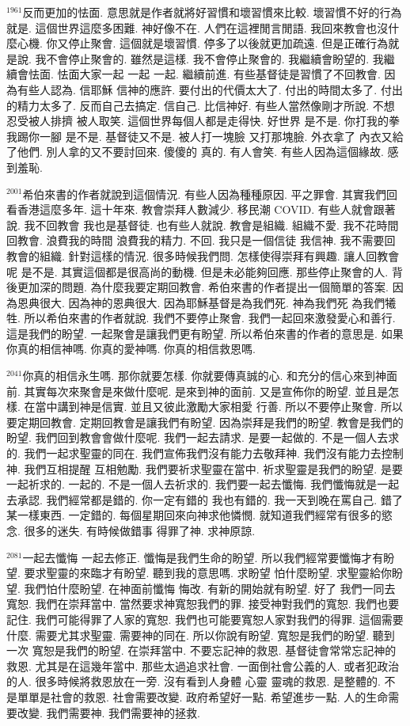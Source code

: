 \documentclass{book}
\begin{document}
$^{1961}$反而更加的怯面.
意思就是作者就將好習慣和壞習慣來比較.
壞習慣不好的行為就是.
這個世界這麼多困難.
神好像不在.
人們在這裡閒言閒語.
我回來教會也沒什麼心機.
你又停止聚會.
這個就是壞習慣.
停多了以後就更加疏遠.
但是正確行為就是說.
我不會停止聚會的.
雖然是這樣.
我不會停止聚會的.
我繼續會盼望的.
我繼續會怯面.
怯面大家一起 一起 一起.
繼續前進.
有些基督徒是習慣了不回教會.
因為有些人認為.
信耶穌 信神的應許.
要付出的代價太大了.
付出的時間太多了.
付出的精力太多了.
反而自己去搞定.
信自己.
比信神好.
有些人當然像剛才所說.
不想忍受被人排擠 被人取笑.
這個世界每個人都是走得快.
好世界 是不是.
你打我的拳 我踢你一腳 是不是.
基督徒又不是.
被人打一塊臉 又打那塊臉.
外衣拿了 內衣又給了他們.
別人拿的又不要討回來.
傻傻的 真的.
有人會笑.
有些人因為這個緣故.
感到羞恥.

$^{2001}$希伯來書的作者就說到這個情況.
有些人因為種種原因.
平之罪會.
其實我們回看香港這麼多年.
這十年來.
教會崇拜人數減少.
移民潮 COVID.
有些人就會跟著說.
我不回教會 我也是基督徒.
也有些人就說.
教會是組織.
組織不愛.
我不花時間回教會.
浪費我的時間 浪費我的精力.
不回.
我只是一個信徒 我信神.
我不需要回教會的組織.
針對這樣的情況.
很多時候我們問.
怎樣使得崇拜有興趣.
讓人回教會呢 是不是.
其實這個都是很高尚的動機.
但是未必能夠回應.
那些停止聚會的人.
背後更加深的問題.
為什麼我要定期回教會.
希伯來書的作者提出一個簡單的答案.
因為恩典很大.
因為神的恩典很大.
因為耶穌基督是為我們死.
神為我們死 為我們犧牲.
所以希伯來書的作者就說.
我們不要停止聚會.
我們一起回來激發愛心和善行.
這是我們的盼望.
一起聚會是讓我們更有盼望.
所以希伯來書的作者的意思是.
如果你真的相信神嗎.
你真的愛神嗎.
你真的相信救恩嗎.

$^{2041}$你真的相信永生嗎.
那你就要怎樣.
你就要傳真誠的心.
和充分的信心來到神面前.
其實每次來聚會是來做什麼呢.
是來到神的面前.
又是宣佈你的盼望.
並且是怎樣.
在當中講到神是信實.
並且又彼此激勵大家相愛 行善.
所以不要停止聚會.
所以要定期回教會.
定期回教會是讓我們有盼望.
因為崇拜是我們的盼望.
教會是我們的盼望.
我們回到教會會做什麼呢.
我們一起去請求.
是要一起做的.
不是一個人去求的.
我們一起求聖靈的同在.
我們宣佈我們沒有能力去敬拜神.
我們沒有能力去控制神.
我們互相提醒 互相勉勵.
我們要祈求聖靈在當中.
祈求聖靈是我們的盼望.
是要一起祈求的.
一起的.
不是一個人去祈求的.
我們要一起去懺悔.
我們懺悔就是一起去承認.
我們經常都是錯的.
你一定有錯的 我也有錯的.
我一天到晚在罵自己.
錯了某一樣東西.
一定錯的.
每個星期回來向神求他憐憫.
就知道我們經常有很多的慾念.
很多的迷失.
有時候做錯事 得罪了神.
求神原諒.

$^{2081}$一起去懺悔 一起去修正.
懺悔是我們生命的盼望.
所以我們經常要懺悔才有盼望.
要求聖靈的來臨才有盼望.
聽到我的意思嗎.
求盼望 怕什麼盼望.
求聖靈給你盼望.
我們怕什麼盼望.
在神面前懺悔 悔改.
有新的開始就有盼望.
好了 我們一同去寬恕.
我們在崇拜當中.
當然要求神寬恕我們的罪.
接受神對我們的寬恕.
我們也要記住.
我們可能得罪了人家的寬恕.
我們也可能要寬恕人家對我們的得罪.
這個需要什麼.
需要尤其求聖靈.
需要神的同在.
所以你說有盼望.
寬恕是我們的盼望.
聽到一次 寬恕是我們的盼望.
在崇拜當中.
不要忘記神的救恩.
基督徒會常常忘記神的救恩.
尤其是在這幾年當中.
那些太過追求社會.
一面倒社會公義的人.
或者犯政治的人.
很多時候將救恩放在一旁.
沒有看到人身體 心靈 靈魂的救恩.
是整體的.
不是單單是社會的救恩.
社會需要改變.
政府希望好一點.
希望進步一點.
人的生命需要改變.
我們需要神.
我們需要神的拯救.
\end{document}
